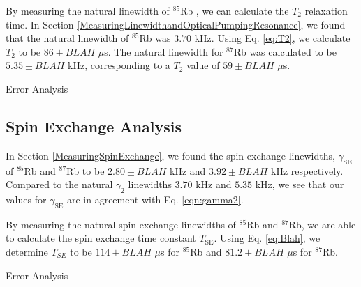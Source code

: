 By measuring the natural linewidth of $^{85}$Rb , we can calculate the $T_2$ relaxation time.  In Section \ref{MeasuringLinewidthandOpticalPumpingResonance}, we found that the natural linewidth of $^{85}$Rb was $3.70$ kHz.  Using Eq. \ref{eq:T2}, we calculate $T_2$ to be $86 \pm BLAH$ $\mu$s. The natural linewidth for $^{87}$Rb was calculated to be $5.35 \pm BLAH$ kHz, corresponding to a $T_2$ value of  $59 \pm BLAH$ $\mu$s.

Error Analysis


\subsection{Spin Exchange Analysis}\label{SpinExchangeAnalysis}

In Section \ref{MeasuringSpinExchange}, we found the spin exchange linewidths, $\gamma_{\mathrm{SE}}$ of $^{85}$Rb and $^{87}$Rb to be $2.80 \pm BLAH$ kHz and $3.92 \pm BLAH$ kHz respectively. Compared to the natural $\gamma_2$ linewidths $3.70$ kHz  and $5.35$ kHz, we see that our values for $\gamma_{\mathrm{SE}}$ are in agreement with Eq. \ref{eqn:gamma2}.

By measuring the natural spin exchange linewidths of $^{85}$Rb and $^{87}$Rb, we are able to calculate the spin exchange time constant $T_{\mathrm{SE}}$.  Using Eq. \ref{eq:Blah}, we determine $T_{SE}$ to be $114 \pm BLAH$ $\mu$s for  $^{85}$Rb and $81.2 \pm BLAH$ $\mu$s for  $^{87}$Rb. 


Error Analysis